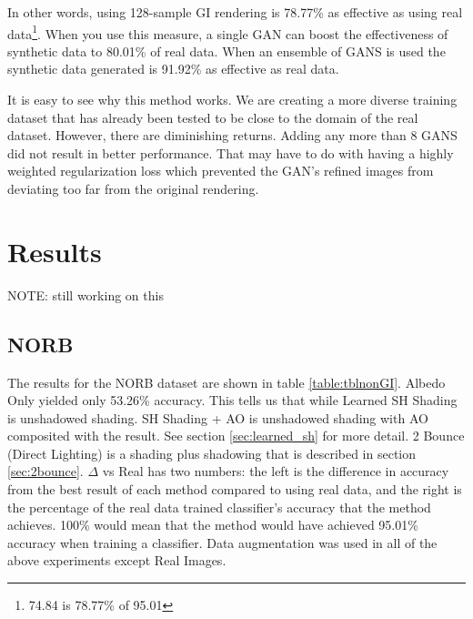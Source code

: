 \documentclass[10pt,twocolumn,letterpaper]{article}
\begin{document}
In other words, using 128-sample GI rendering is 78.77\% as effective as using real data\footnote{74.84 is 78.77\% of 95.01}.  When you use this measure, a single GAN can boost the effectiveness of synthetic data to 80.01\% of real data.  When an ensemble of GANS is used the synthetic data generated is 91.92\% as effective as real data. 


It is easy to see why this method works. We are creating a more diverse training dataset that has already been tested to be close to the domain of the real dataset.  However, there are diminishing returns.  Adding any more than 8 GANS did not result in better performance.  That may have to do with having a highly weighted regularization loss which prevented the GAN's refined images from deviating too far from the original rendering.  

\section{Results}
NOTE: still working on this
\subsection{NORB}
The results for the NORB dataset are shown in table \ref{table:tblnonGI}. Albedo Only yielded only 53.26\% accuracy. This tells us that while  Learned SH Shading is unshadowed shading. SH Shading + AO is unshadowed shading with AO composited with the result. See section \ref{sec:learned_sh} for more detail. 2 Bounce (Direct Lighting) is a shading plus shadowing that is described in section \ref{sec:2bounce}. $\Delta$ vs Real has two numbers: the left is the difference in accuracy from the best result of each method compared to using real data, and the right is the percentage of the real data trained classifier's accuracy that the method achieves.  100\% would mean that the method would have achieved 95.01\% accuracy when training a classifier. Data augmentation was used in all of the above experiments except Real Images. 
\end{document}
